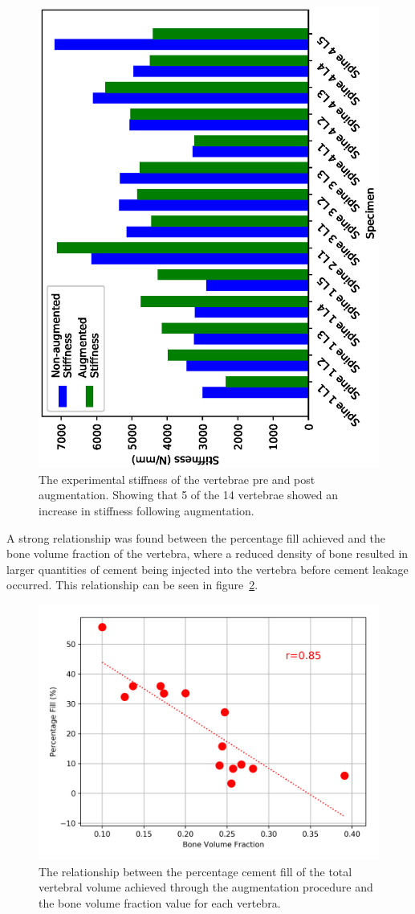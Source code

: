 \begin{figure}[h!]
  \centering
  \includegraphics[width=.7\textwidth]{Chapters/Chapter_HT_images/aug_non_aug_stiffness}
	\caption{The experimental stiffness of the vertebrae pre and post augmentation. Showing that 5 of the 14 vertebrae showed an increase in stiffness following augmentation.}
  \label{fig:aug_non_aug_stiffness}
\end{figure}

A strong relationship was found between the percentage fill achieved and the bone volume fraction of the vertebra, where a reduced density of bone resulted in larger quantities of cement being injected into the vertebra before cement leakage occurred.
This relationship can be seen in figure~\ref{fig:cmt_fill_vs_bvtv}.

\begin{figure}[ht!]
  \centering
  \includegraphics[width=.7\textwidth]{Chapters/Chapter_HT_images/cmt_fill_vs_bvtv.png}
	\caption{The relationship between the percentage cement fill of the total vertebral volume  achieved through the augmentation procedure and the bone volume fraction value for each vertebra. }
  \label{fig:cmt_fill_vs_bvtv}
\end{figure}

